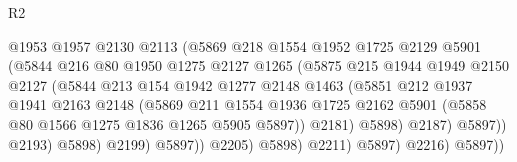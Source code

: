 \begin{lexlean}{R2}
\begin{coremodule}
                                  @1953
                                  @1957
                                  @2130
                                  @2113
                                  (@5869
                                    @218
                                    @1554
                                    @1952
                                    @1725
                                    @2129
                                    @5901
                                    (@5844
                                      @216
                                      @80
                                      @1950
                                      @1275
                                      @2127
                                      @1265
                                      (@5875
                                        @215
                                        @1944
                                        @1949
                                        @2150
                                        @2127
                                        (@5844
                                          @213
                                          @154
                                          @1942
                                          @1277
                                          @2148
                                          @1463
                                          (@5851
                                            @212
                                            @1937
                                            @1941
                                            @2163
                                            @2148
                                            (@5869
                                              @211
                                              @1554
                                              @1936
                                              @1725
                                              @2162
                                              @5901
                                              (@5858 @80 @1566 @1275 @1836 @1265 @5905 @5897))
                                            @2181)
                                          @5898)
                                        @2187)
                                      @5897))
                                  @2193)
                                @5898)
                              @2199)
                            @5897))
                        @2205)
                      @5898)
                    @2211)
                  @5897)
                @2216)
              @5897))

\end{coremodule}
\end{lexlean}
